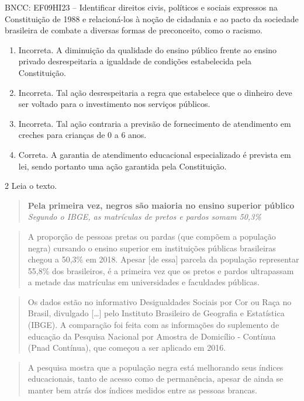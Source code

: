 BNCC: EF09HI23 -- Identificar direitos civis, políticos e sociais
expressos na Constituição de 1988 e relacioná-los à noção de cidadania e
ao pacto da sociedade brasileira de combate a diversas formas de
preconceito, como o racismo.

\begin{enumerate}
\def\labelenumi{\alph{enumi})}
\tightlist
\item
  Incorreta. A diminuição da qualidade do ensino público frente ao
  ensino privado desrespeitaria a igualdade de condições estabelecida
  pela Constituição.
\item
  Incorreta. Tal ação desrespeitaria a regra que estabelece que o
  dinheiro deve ser voltado para o investimento nos serviços públicos.
\item
  Incorreta. Tal ação contraria a previsão de fornecimento de
  atendimento em creches para crianças de 0 a 6 anos.
\item
  Correta. A garantia de atendimento educacional especializado é
  prevista em lei, sendo portanto uma ação garantida pela Constituição.
\end{enumerate}

\num{2} Leia o texto.

\begin{quote}
\textbf{Pela primeira vez, negros são maioria no ensino superior público}
\textit{Segundo o IBGE, as matrículas de pretos e pardos somam 50,3\%}
\end{quote}

\begin{quote}
A proporção de pessoas pretas ou pardas (que compõem a população negra)
cursando o ensino superior em instituições públicas brasileiras chegou a
50,3\% em 2018. Apesar {[}de essa{]} parcela da população representar
55,8\% dos brasileiros, é a primeira vez que os pretos e pardos
ultrapassam a metade das matrículas em universidades e faculdades
públicas.
\end{quote}

\begin{quote}
Os dados estão no informativo Desigualdades Sociais por Cor ou Raça no
Brasil, divulgado {[}\ldots{}{]} pelo Instituto Brasileiro de Geografia
e Estatística (IBGE). A comparação foi feita com as informações do
suplemento de educação da Pesquisa Nacional por Amostra de Domicílio -
Contínua (Pnad Contínua), que começou a ser aplicado em 2016.
\end{quote}

\begin{quote}
A pesquisa mostra que a população negra está melhorando seus índices
educacionais, tanto de acesso como de permanência, apesar de ainda se
manter bem atrás dos índices medidos entre as pessoas brancas.
\end{quote}

